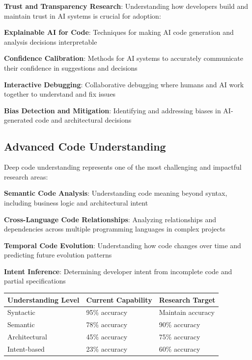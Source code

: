 \textbf{Trust and Transparency Research}:
Understanding how developers build and maintain trust in AI systems is crucial for adoption:

\begin{compactlist}
    \item \textbf{Explainable AI for Code}: Techniques for making AI code generation and analysis decisions interpretable
    \item \textbf{Confidence Calibration}: Methods for AI systems to accurately communicate their confidence in suggestions and decisions
    \item \textbf{Interactive Debugging}: Collaborative debugging where humans and AI work together to understand and fix issues
    \item \textbf{Bias Detection and Mitigation}: Identifying and addressing biases in AI-generated code and architectural decisions
\end{compactlist}

\subsection*{Advanced Code Understanding}

Deep code understanding represents one of the most challenging and impactful research areas:

\begin{expandedlist}
    \item \textbf{Semantic Code Analysis}: Understanding code meaning beyond syntax, including business logic and architectural intent
    \item \textbf{Cross-Language Code Relationships}: Analyzing relationships and dependencies across multiple programming languages in complex projects
    \item \textbf{Temporal Code Evolution}: Understanding how code changes over time and predicting future evolution patterns
    \item \textbf{Intent Inference}: Determining developer intent from incomplete code and partial specifications
\end{expandedlist}

\begin{center}
\begin{tabular}{@{}lll@{}}
\toprule
\textbf{Understanding Level} & \textbf{Current Capability} & \textbf{Research Target} \\
\midrule
Syntactic & 95\% accuracy & Maintain accuracy \\
Semantic & 78\% accuracy & 90\% accuracy \\
Architectural & 45\% accuracy & 75\% accuracy \\
Intent-based & 23\% accuracy & 60\% accuracy \\
\bottomrule
\end{tabular}
\end{center}

